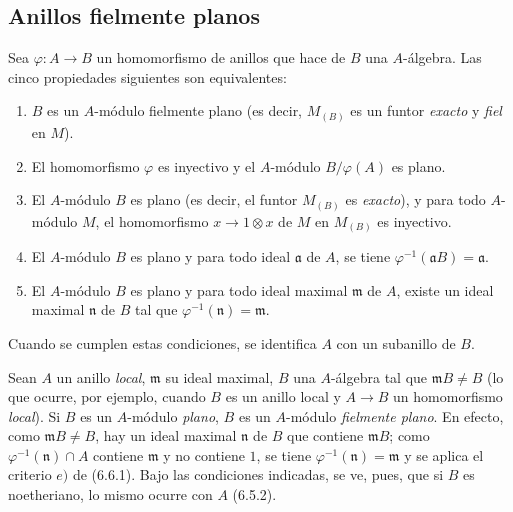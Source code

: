 \subsection{Anillos fielmente planos}
\label{subsection:0.6.6-fr}

\begin{env}[6.6.1]
\label{0.6.6.1-fr}
Sea $\varphi:A\to B$ un homomorfismo de anillos que hace de $B$ una
$A$-álgebra. Las cinco propiedades siguientes son equivalentes:
\begin{enumerate}
  \item[$a)$] $B$ es un $A$-módulo fielmente plano (es decir,
    $M_{(B)}$ es un funtor \emph{exacto} y \emph{fiel} en $M$).
  \item[$b)$] El homomorfismo $\varphi$ es inyectivo y el $A$-módulo
    $B/\varphi(A)$ es plano.


  \item[$c)$] El $A$-módulo $B$ es plano (es decir, el funtor
    $M_{(B)}$ es \emph{exacto}), y para todo $A$-módulo $M$, el homomorfismo
    $x\to1\otimes x$ de $M$ en $M_{(B)}$ es inyectivo.
  \item[$d)$] El $A$-módulo $B$ es plano y para todo ideal $\mathfrak a$ de
    $A$, se tiene $\varphi^{-1}(\mathfrak aB)=\mathfrak a$.
  \item[$e)$] El $A$-módulo $B$ es plano y para todo ideal maximal
    $\mathfrak m$ de $A$, existe un ideal maximal $\mathfrak n$ de $B$ tal
    que $\varphi^{-1}(\mathfrak n)=\mathfrak m$.
\end{enumerate}

Cuando se cumplen estas condiciones, se identifica $A$ con un subanillo de $B$.
\end{env}

\begin{env}[6.6.2]
\label{0.6.6.2-fr}
Sean $A$ un anillo \emph{local}, $\mathfrak m$ su ideal maximal, $B$ una
$A$-álgebra tal que $\mathfrak mB\neq B$ (lo que ocurre, por ejemplo, cuando
$B$ es un anillo local y $A\to B$ un homomorfismo \emph{local}). Si $B$ es un
$A$-módulo \emph{plano}, $B$ es un $A$-módulo \emph{fielmente plano}. En efecto, como
$\mathfrak mB\neq B$, hay un ideal maximal $\mathfrak n$ de $B$ que contiene
$\mathfrak mB$; como $\varphi^{-1}(\mathfrak n)\cap A$ contiene
$\mathfrak m$ y no contiene $1$, se tiene
$\varphi^{-1}(\mathfrak n)=\mathfrak m$ y se aplica el criterio $e)$ de (6.6.1).
Bajo las condiciones indicadas, se ve, pues, que si $B$ es
noetheriano, lo mismo ocurre con $A$ (6.5.2).
\end{env}

